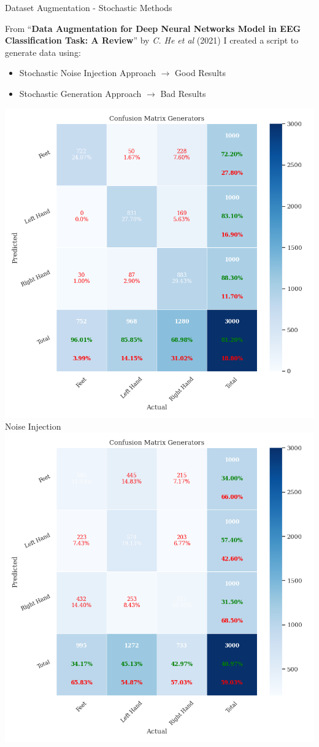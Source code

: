 \begin{frame}{Dataset Augmentation - Stochastic Methods}
    \begin{minipage}[c]{.65\textwidth}            
        From ``\textbf{Data Augmentation for Deep Neural Networks Model in EEG Classification Task: A Review}'' by \textit{C. He et al} (2021) I created a script to generate data using:
        \begin{itemize}
            \item Stochastic Noise Injection Approach $\rightarrow{}$ Good Results
            \item Stochastic Generation Approach $\rightarrow{}$ Bad Results
        \end{itemize}
    \end{minipage}
    \begin{minipage}[c]{.33\textwidth}
            \centering
            \includegraphics[width=.8\textwidth]{figures/augmentation/stochastic/confusion_matrix_generators_2024_03_30_18_00_20_noise_injector_using_LSTMNet_0.5943600867678959.pkl.png}\\
            {\tiny Noise Injection}\\
            \includegraphics[width=.8\textwidth]{figures/augmentation/stochastic/confusion_matrix_generators_2024_03_30_18_01_19_random_sampler_using_LSTMNet_0.5943600867678959.pkl.png}

\end{minipage}
\end{frame}
